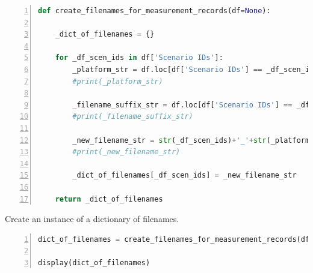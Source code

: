 \documentclass[10pt,parskip=half,
toc=sectionentrywithdots,
bibliography=totocnumbered,
captions=tableheading,numbers=noendperiod]{scrartcl}
\begin{document}
\begin{codecell}[H]
\caption{Function for creation of dictionary with filenames}
\label{code:f_dict_filenames}
\begin{lstlisting}[language=Python,numbers=left,xleftmargin=20pt,xrightmargin=5pt,belowskip=5pt,aboveskip=5pt]
def create_filenames_for_measurement_records(df=None):

    _dict_of_filenames = {}

    for _df_scen_ids in df['Scenario IDs']:
        _platform_str = df.loc[df['Scenario IDs'] == _df_scen_ids, 'Measurement platform'].iloc[0]
        #print(_platform_str)

        _filename_suffix_str = df.loc[df['Scenario IDs'] == _df_scen_ids, 'Dataframe, CSV/Image suffixes'].iloc[0]
        #print(_filename_suffix_str)

        _new_filename_str = str(_df_scen_ids)+'_'+str(_platform_str)+str(_filename_suffix_str)
        #print(_new_filename_str)

        _dict_of_filenames[_df_scen_ids] = _new_filename_str

    return _dict_of_filenames
\end{lstlisting}\end{codecell}

Create an instance of a dictionary of filenames.

\begin{codecell}[H]
\begin{lstlisting}[language=Python,numbers=left,xleftmargin=20pt,xrightmargin=5pt,belowskip=5pt,aboveskip=5pt]
dict_of_filenames = create_filenames_for_measurement_records(df_measurement_configs)

display(dict_of_filenames)
\end{lstlisting}\end{codecell}
\end{document}
